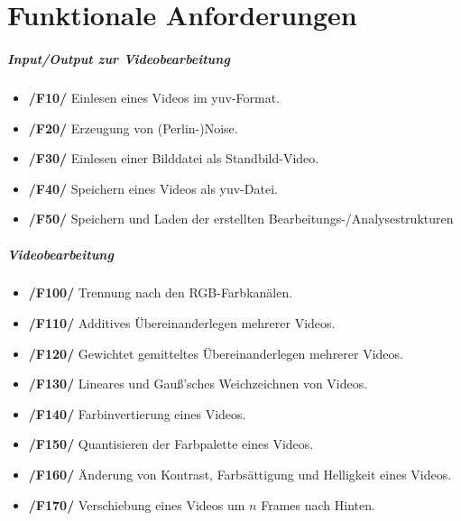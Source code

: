 \section{Funktionale Anforderungen}

\subparagraph{Input/Output zur Videobearbeitung} 
\begin{itemize} 
	\item \textbf{/F10/} Einlesen eines Videos im yuv-Format.
	\item \textbf{/F20/} Erzeugung von (Perlin-)Noise.
	\item \textbf{/F30/} Einlesen einer Bilddatei als Standbild-Video.
	\item \textbf{/F40/} Speichern eines Videos als yuv-Datei.
	\item \textbf{/F50/} Speichern und Laden der erstellten Bearbeitungs-/Analysestrukturen
\end{itemize}

\subparagraph{Videobearbeitung}
\begin{itemize}
	\item \textbf{/F100/} Trennung nach den RGB-Farbkanälen.
	\item \textbf{/F110/} Additives Übereinanderlegen mehrerer Videos.
	\item \textbf{/F120/} Gewichtet gemitteltes Übereinanderlegen mehrerer Videos.
	\item \textbf{/F130/} Lineares und Gauß'sches Weichzeichnen von Videos.
	\item \textbf{/F140/} Farbinvertierung eines Videos.
	\item \textbf{/F150/} Quantisieren der Farbpalette eines Videos.
	\item \textbf{/F160/} Änderung von Kontrast, Farbsättigung und Helligkeit eines Videos.
	\item \textbf{/F170/} Verschiebung eines Videos um $n$ Frames nach Hinten.	
\end{itemize}

